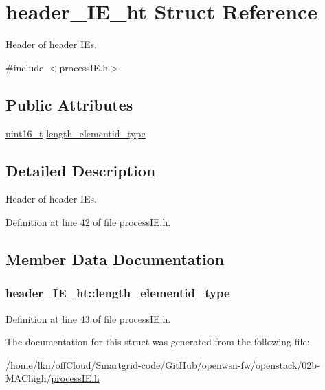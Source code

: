 \hypertarget{structheader___i_e__ht}{}\section{header\+\_\+\+I\+E\+\_\+ht Struct Reference}
\label{structheader___i_e__ht}


Header of header I\+Es.  




{\ttfamily \#include $<$process\+I\+E.\+h$>$}

\subsection*{Public Attributes}
\begin{DoxyCompactItemize}
\item 
\hyperlink{_p_e___types_8h_a1f1825b69244eb3ad2c7165ddc99c956}{uint16\+\_\+t} \hyperlink{structheader___i_e__ht_aab33ba052aca4eb458c8065bf0e63404}{length\+\_\+elementid\+\_\+type}
\end{DoxyCompactItemize}


\subsection{Detailed Description}
Header of header I\+Es. 

Definition at line 42 of file process\+I\+E.\+h.



\subsection{Member Data Documentation}
\subsubsection[{\texorpdfstring{length\+\_\+elementid\+\_\+type}{length_elementid_type}}]{ header\+\_\+\+I\+E\+\_\+ht\+::length\+\_\+elementid\+\_\+type}\hypertarget{structheader___i_e__ht_aab33ba052aca4eb458c8065bf0e63404}{}\label{structheader___i_e__ht_aab33ba052aca4eb458c8065bf0e63404}


Definition at line 43 of file process\+I\+E.\+h.



The documentation for this struct was generated from the following file\+:\begin{DoxyCompactItemize}
\item 
/home/lkn/off\+Cloud/\+Smartgrid-\/code/\+Git\+Hub/openwsn-\/fw/openstack/02b-\/\+M\+A\+Chigh/\hyperlink{process_i_e_8h}{process\+I\+E.\+h}\end{DoxyCompactItemize}
